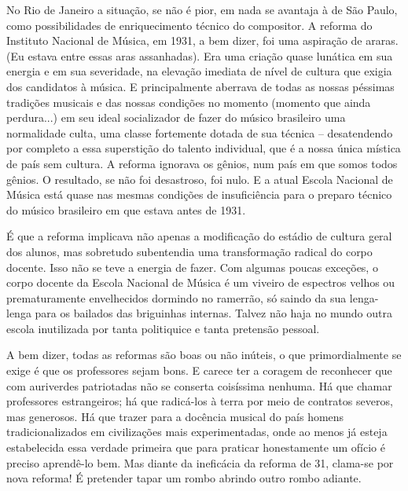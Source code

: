 No Rio de Janeiro a situação, se não é pior, em nada se avantaja à de
São Paulo, como possibilidades de enriquecimento técnico do compositor.
A reforma do Instituto Nacional de Música, em 1931, a bem dizer, foi uma
aspiração de araras. (Eu estava entre essas aras assanhadas). Era uma
criação quase lunática em sua energia e em sua severidade, na elevação
imediata de nível de cultura que exigia dos candidatos à música. E
principalmente aberrava de todas as nossas péssimas tradições musicais e
das nossas condições no momento (momento que ainda perdura...) em seu
ideal socializador de fazer do músico brasileiro uma normalidade culta,
uma classe fortemente dotada de sua técnica -- desatendendo por completo
a essa superstição do talento individual, que é a nossa única mística de
país sem cultura. A reforma ignorava os gênios, num país em que somos
todos gênios. O resultado, se não foi desastroso, foi nulo. E a atual
Escola Nacional de Música está quase nas mesmas condições de
insuficiência para o preparo técnico do músico brasileiro em que estava
antes de 1931.

É que a reforma implicava não apenas a modificação do estádio de cultura
geral dos alunos, mas sobretudo subentendia uma transformação radical do
corpo docente. Isso não se teve a energia de fazer. Com algumas poucas
exceções, o corpo docente da Escola Nacional de Música é um viveiro de
espectros velhos ou prematuramente envelhecidos dormindo no ramerrão, só
saindo da sua lenga-lenga para os bailados das briguinhas internas.
Talvez não haja no mundo outra escola inutilizada por tanta politiquice
e tanta pretensão pessoal.

A bem dizer, todas as reformas são boas ou não inúteis, o que
primordialmente se exige é que os professores sejam bons. E carece ter a
coragem de reconhecer que com auriverdes patriotadas não se conserta
coisíssima nenhuma. Há que chamar professores estrangeiros; há que
radicá-los à terra por meio de contratos severos, mas generosos. Há que
trazer para a docência musical do país homens tradicionalizados em
civilizações mais experimentadas, onde ao menos já esteja estabelecida
essa verdade primeira que para praticar honestamente um ofício é preciso
aprendê-lo bem. Mas diante da ineficácia da reforma de 31, clama-se por
nova reforma! É pretender tapar um rombo abrindo outro rombo adiante.

